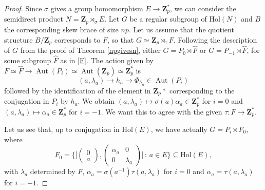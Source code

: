 \documentclass[12pt]{article}
\theoremstyle{definition}
\newcommand{\Z}{\mathbf Z}
\newcommand{\Hol}{\mathrm{Hol}}
\newcommand{\Aut}{\operatorname{Aut}}
\begin{document}
\begin{proof}
Since $\sigma$ gives a group homomorphism $E\to \Z_p^*$, we can consider the semidirect product $N=\Z_p\rtimes_{\sigma}E$.  Let $G$ be a regular subgroup of $\Hol(N)$ and $B$ the corresponding skew brace of size $np$. Let us assume that the quotient structure $B/\Z_p$ corresponds to $F$, so that $G\simeq \Z_p\rtimes_{\tau} F$. Following the description of $G$ from the proof of Theorem \ref{npgivesn}, either $G=P_0 \rtimes \hat F$ or $G=P_{-1}\rtimes \hat F$, for some subgroup $\hat F$ as in \eqref{F}. The action given by $F\simeq \hat F\to \Aut(P_i)\simeq \Aut(\Z_p)\simeq \Z_p^*$ is 
$$
(a,\lambda_a)\to h_a\to \Phi_{h_a} \in\Aut(P_i)
$$
followed by the identification of the element in $\Z_p*$ corresponding to the conjugation in $P_i$ by $h_a$.
We obtain 
 $(a,\lambda_a) \mapsto \sigma(a)\alpha_a\in\Z_p^*$ for $i=0$ and $(a,\lambda_a) \mapsto \alpha_a\in \Z_p^*$ for $i=-1$. We want this to agree with the given $\tau:F\to \Z_p^*.$

Let us see that, up to conjugation in $\Hol(E)$, we have actually $G=P_i \rtimes F_0$, where
$$F_0=\Big\{\Big[\begin{pmatrix}
		0\\
		a
		\end{pmatrix},\begin{pmatrix}
		\alpha_a & 0\\
		0&\lambda_a
		\end{pmatrix}\Big] \, : \, a \in E\Big\}\subseteq \Hol(E),$$
with $\lambda_a$ determined by $F$, $\alpha_a=\sigma(a^{-1})\tau(a,\lambda_a)$ for $i=0$ and $\alpha_a=\tau(a,\lambda_a)$ for $i=-1$.


\end{proof}
\end{document}
